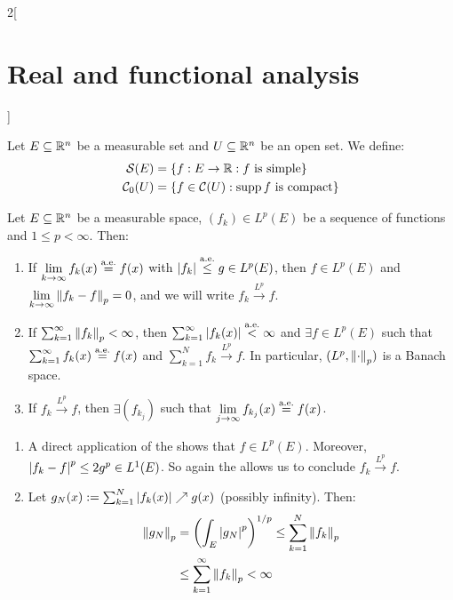\documentclass[../../../main_math.tex]{subfiles}
\begin{document}
\begin{multicols}{2}[\section{Real and functional analysis}]
  \begin{definition}
    Let $E\subseteq\mathbb{R}^n$ be a measurable set and $U\subseteq \mathbb{R}^n$ be an open set. We define:
    \begin{align*}
      \mathcal{S}(E)   & =\{f:E\rightarrow\mathbb{R}:f\text{ is simple}\}         \\
      \mathcal{C}_0(U) & =\{f\in\mathcal{C}(U):\operatorname{supp} f\text{ is compact}\}
    \end{align*}
  \end{definition}
  \begin{theorem}
    Let $E\subseteq\mathbb{R}^n$ be a measurable space, $({f}_k)\in L^p(E)$ be a sequence of functions and $1\leq p<\infty$. Then:
    \begin{enumerate}
      \item\label{RFA:thmLpBanachA} If $\displaystyle\lim_{k\to\infty}f_k(x)\overset{\text{a.e.}}{=}{f}(x)$ with $\abs{{f}_k}\overset{\text{a.e.}}{\leq} g\in L^p(E)$, then ${f}\in L^p(E)$ and $\displaystyle\lim_{k\to\infty}\left\|{f}_k-{f}\right\|_p=0$, and we will write ${f}_k\overset{L^p}{\rightarrow}{f}$.
      \item\label{RFA:thmLpBanachB} If $\sum_{k=1}^\infty\left\|{f}_k\right\|_p<\infty$, then $\sum_{k=1}^\infty\abs{f_k(x)}\overset{\text{a.e.}}{<}\infty$ and $\exists f\in L^p(E)$ such that $\sum_{k=1}^\infty f_k(x)\overset{\text{a.e.}}{=}f(x)$ and $\sum_{k=1}^N{f}_k\overset{L^p}{\rightarrow}{f}$. In particular, $(L^p,\left\|\cdot\right\|_p)$ is a Banach space.
      \item\label{RFA:thmLpBanachC} If ${f}_k\overset{L^p}{\rightarrow}{f}$, then $\exists(f_{k_j})$ such that $\displaystyle\lim_{j\to\infty}f_{k_j}(x)\overset{\text{a.e.}}{=}{f}(x)$.
    \end{enumerate}
  \end{theorem}
  \begin{sproof}
    \begin{enumerate}
      \item A direct application of the  shows that $f\in L^p(E)$. Moreover, $\abs{f_k-f}^p\leq{2g}^p\in L^1(E)$. So again the  allows us to conclude ${f}_k\overset{L^p}{\rightarrow}{f}$.
      \item Let $g_N(x):=\sum_{k=1}^N\abs{f_k(x)}\nearrow g(x)$ (possibly infinity). Then:
            \begin{align*}
              \norm{g_N}_p & ={\left(\int_E{\abs{g_N}}^p\right)}^{1/p}\leq \sum_{k=1}^N\norm{{f}_k}_p \\
                           & \leq\sum_{k=1}^\infty\norm{{f}_k}_p<\infty

\end{align*}
\end{enumerate}
\end{sproof}
\end{multicols}
\end{document}
